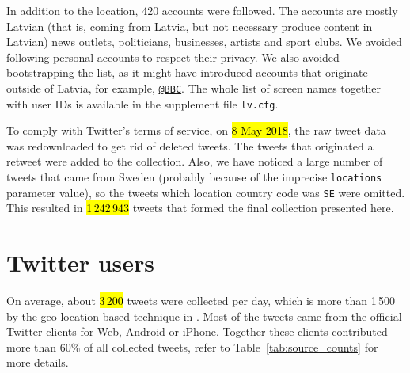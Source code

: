 \documentclass{IOS-Book-Article}
\makeatletter
\newcommand{\sn}[1]{\href{https://twitter.com/#1}{\texttt{@#1}}}
\newcommand{\sfile}[1]{\texttt{#1}}
\makeatother
\begin{document}
In addition to the location, 420 accounts were followed.\footnotemark{} The accounts are mostly Latvian (that is, coming from Latvia, but not necessary produce content in Latvian) news outlets, politicians, businesses, artists and sport clubs. We avoided following personal accounts to respect their privacy. We also avoided bootstrapping the list, as it might have introduced accounts that originate outside of Latvia, for example, \sn{BBC}. The whole list of screen names together with user IDs is available in the supplement file \sfile{lv.cfg}.



To comply with Twitter's terms of service, on \hl{8 May 2018}, the raw tweet data was redownloaded to get rid of deleted tweets. The tweets that originated a retweet were added to the collection. Also, we have noticed a large number of tweets that came from Sweden (probably because of the imprecise \texttt{locations} parameter value), so the tweets which location country code was \texttt{SE} were omitted. This resulted in \hl{1\,242\,943} tweets that formed the final collection presented here.

\section{Twitter users}
\label{sec:global-analysis}



On average, about \hl{3\,200} tweets were collected per day, which is more than 1\,500 by the geo-location based technique in \cite{milajevs:2017:BUCC}. Most of the tweets came from the official Twitter clients for Web, Android or iPhone. Together these clients contributed more than 60\% of all collected tweets, refer to Table~\ref{tab:source_counts} for more details.
\end{document}
